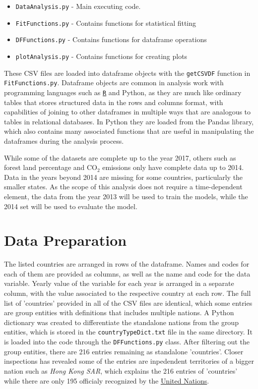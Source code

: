 \documentclass[11pt,a4paper,titlepage]{article}
\newcommand{\blankline}{\quad\pagebreak[2]}
\begin{document}
\begin{itemize}
    \item \texttt{DataAnalysis.py} - Main executing code.
    \item \texttt{FitFunctions.py} - Contains functions for statistical fitting
    \item \texttt{DFFunctions.py} - Contains functions for dataframe operations
    \item \texttt{plotAnalysis.py} - Contains functions for creating plots
\end{itemize}

These CSV files are loaded into dataframe objects with the \texttt{getCSVDF} function in \texttt{FitFunctions.py}. Dataframe objects are common in analysis work with programming languages such as \href{https://www.r-project.org/}{\texttt{R}} and Python, as they are much like ordinary tables that stores structured data in the rows and columns format, with capabilities of joining to other dataframes in multiple ways that are analogous to tables in relational databases. In Python they are loaded from the Pandas library, which also contains many associated functions that are useful in manipulating the dataframes during the analysis process. 

\blankline

While some of the datasets are complete up to the year 2017, others such as forest land percentage and CO$_{2}$ emissions only have complete data up to 2014. Data in the years beyond 2014 are missing for some countries, particularly the smaller states. As the scope of this analysis does not require a time-dependent element, the data from the year 2013 will be used to train the models, while the 2014 set will be used to evaluate the model.

\section{Data Preparation}

The listed countries are arranged in rows of the dataframe. Names and codes for each of them are provided as columns, as well as the name and code for the data variable. Yearly value of the variable for each year is arranged in a separate column, with the value associated to the respective country at each row. The full list of 'countries' provided in all of the CSV files are identical, which some entries are group entities with definitions that includes multiple nations. A Python dictionary was created to differentiate the standalone nations from the group entities, which is stored in the \texttt{countryTypeDict.txt} file in the same directory. It is loaded into the code through the \texttt{DFFunctions.py} class. After filtering out the group entities, there are 216 entries remaining as standalone 'countries'. Closer inspections has revealed some of the entries are inpedendent territories of a bigger nation such as \textit{Hong Kong SAR}, which explains the 216 entries of 'countries' while there are only 195 officialy recognized by the \href{http://www.un.org/en/index.html}{United Nations}.
\end{document}
